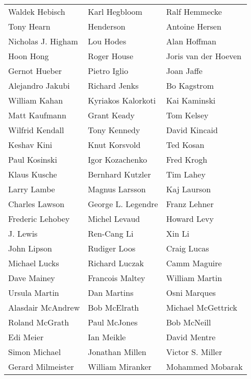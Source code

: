 \begin{tabular}{lll}
Waldek Hebisch         & Karl Hegbloom          & Ralf Hemmecke\\
 Tony Hearn             & Henderson              & Antoine Hersen\\
Nicholas J. Higham     & Lou Hodes              & Alan Hoffman\\
Hoon Hong              & Roger House            & Joris van der Hoeven\\
Gernot Hueber          & Pietro Iglio           & Joan Jaffe\\
Alejandro Jakubi       & Richard Jenks          & Bo Kagstrom\\
William Kahan          & Kyriakos Kalorkoti     & Kai Kaminski\\
Matt Kaufmann          & Grant Keady            & Tom Kelsey\\
Wilfrid Kendall        & Tony Kennedy           & David Kincaid\\
Keshav Kini            & Knut Korsvold          & Ted Kosan\\
Paul Kosinski          & Igor Kozachenko        & Fred Krogh\\
Klaus Kusche           & Bernhard Kutzler       & Tim Lahey\\
Larry Lambe            & Magnus Larsson         & Kaj Laurson\\
Charles Lawson         & George L. Legendre     & Franz Lehner\\
Frederic Lehobey       & Michel Levaud          & Howard Levy\\
J. Lewis               & Ren-Cang Li            & Xin Li\\
John Lipson            & Rudiger Loos           & Craig Lucas\\
Michael Lucks          & Richard Luczak         & Camm Maguire\\
Dave Mainey            & Francois Maltey        & William Martin\\
Ursula Martin          & Dan Martins            & Osni Marques\\
Alasdair McAndrew      & Bob McElrath           & Michael McGettrick\\
Roland McGrath         & Paul McJones           & Bob McNeill\\
Edi Meier              & Ian Meikle             & David Mentre\\
Simon Michael          & Jonathan Millen        & Victor S. Miller\\
Gerard Milmeister      & William Miranker       & Mohammed Mobarak\\

\end{tabular}
